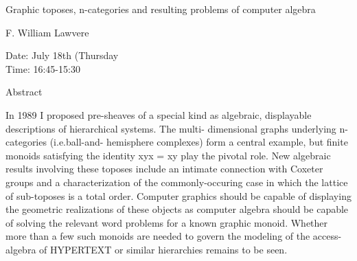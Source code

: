 \begin{center}
\LARGE
Graphic toposes, n-categories and resulting problems of
                       computer algebra
\end{center}

\begin{center}
\Large
F. William Lawvere

\end{center}

\noindent
Date:  July 18th (Thursday\\
Time:  16:45-15:30\\

\begin{center}
\large
Abstract
\end{center}

In 1989 I proposed pre-sheaves of a special kind as algebraic, displayable descriptions of
hierarchical systems. The multi- dimensional graphs underlying n-categories (i.e.ball-and-
hemisphere complexes) form a central example, but finite monoids satisfying the identity xyx = xy
play the pivotal role. New algebraic results involving these toposes include an intimate connection
with Coxeter groups and a characterization of the commonly-occuring case in which the lattice of
sub-toposes is a total order. Computer graphics should be capable of displaying the geometric
realizations of these objects as computer algebra should be capable of solving the relevant word
problems for a known graphic monoid. Whether more than a few such monoids are needed to
govern the modeling of the access-algebra of HYPERTEXT or similar hierarchies remains to be
seen. 

